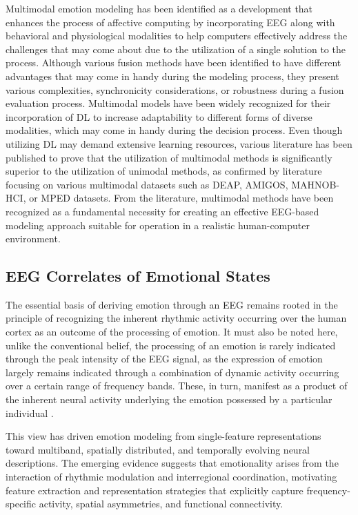 \documentclass{WileyMSP-template}
\begin{document}
Multimodal emotion modeling has been identified as a development that enhances the process of affective computing by incorporating EEG along with behavioral and physiological modalities to help computers effectively address the challenges that may come about due to the utilization of a single solution to the process. Although various fusion methods have been identified to have different advantages that may come in handy during the modeling process, they present various complexities, synchronicity considerations, or robustness during a fusion evaluation process. Multimodal models have been widely recognized for their incorporation of DL to increase adaptability to different forms of diverse modalities, which may come in handy during the decision process. Even though utilizing DL may demand extensive learning resources, various literature has been published to prove that the utilization of multimodal methods is significantly superior to the utilization of unimodal methods, as confirmed by literature focusing on various multimodal datasets such as DEAP, AMIGOS, MAHNOB-HCI, or MPED datasets. From the literature, multimodal methods have been recognized as a fundamental necessity for creating an effective EEG-based modeling approach suitable for operation in a realistic human-computer environment.

\subsection{EEG Correlates of Emotional States}
The essential basis of deriving emotion through an EEG remains rooted in the principle of recognizing the inherent rhythmic activity occurring over the human cortex as an outcome of the processing of emotion. It must also be noted here, unlike the conventional belief, the processing of an emotion is rarely indicated through the peak intensity of the EEG signal, as the expression of emotion largely remains indicated through a combination of dynamic activity occurring over a certain range of frequency bands. These, in turn, manifest as a product of the inherent neural activity underlying the emotion possessed by a particular individual \cite{geng2025dlreview}.

This view has driven emotion modeling from single-feature representations toward multiband, spatially distributed, and temporally evolving neural descriptions. The emerging evidence suggests that emotionality arises from the interaction of rhythmic modulation and interregional coordination, motivating feature extraction and representation strategies that explicitly capture frequency-specific activity, spatial asymmetries, and functional connectivity. 
\end{document}
